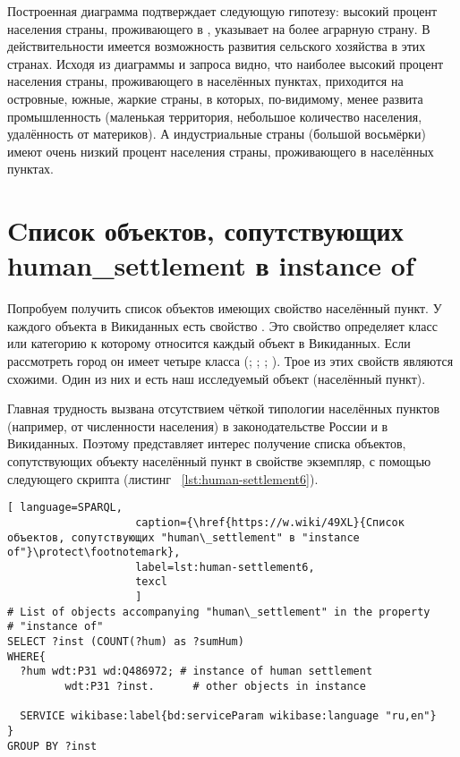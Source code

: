 Построенная диаграмма подтверждает следующую гипотезу: высокий процент населения страны, проживающего в , указывает на более аграрную страну. В действительности имеется возможность развития сельского хозяйства в этих странах. Исходя из диаграммы и запроса видно, что наиболее высокий процент населения страны, проживающего в населённых пунктах, приходится на островные, южные, жаркие страны, в которых, по-видимому, менее развита промышленность (маленькая территория, небольшое количество населения, удалённость от материков). А индустриальные страны (большой восьмёрки) имеют очень низкий процент населения страны, проживающего в населённых пунктах.

\section{Cписок объектов, сопутствующих human\_settlement в instance of }

Попробуем получить список объектов имеющих свойство населённый пункт. У каждого объекта в Викиданных есть свойство . Это свойство определяет класс или категорию к которому относится каждый объект в Викиданных. Если рассмотреть город  он имеет четыре класса (; ; ; ). Трое из этих свойств являются схожими. Один из них и есть наш исследуемый объект (населённый пункт).  

Главная трудность вызвана отсутствием чёткой типологии населённых пунктов (например, от численности населения) в законодательстве России и в Викиданных. Поэтому представляет интерес получение списка объектов, сопутствующих объекту населённый пункт в свойстве экземпляр, с помощью следующего скрипта (листинг ~\protect\ref{lst:human-settlement6}).

\begin{lstlisting}[ language=SPARQL, 
                    caption={\href{https://w.wiki/49XL}{Cписок объектов, сопутствующих "human\_settlement" в "instance of"}\protect\footnotemark},
                    label=lst:human-settlement6,
                    texcl 
                    ]
# List of objects accompanying "human\_settlement" in the property
# "instance of"
SELECT ?inst (COUNT(?hum) as ?sumHum) 
WHERE{          
  ?hum wdt:P31 wd:Q486972; # instance of human settlement
         wdt:P31 ?inst.      # other objects in instance

  SERVICE wikibase:label{bd:serviceParam wikibase:language "ru,en"}
}  
GROUP BY ?inst
\end{lstlisting}%

